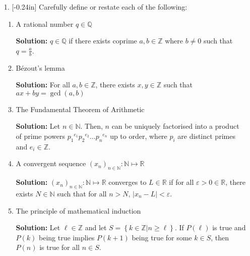\documentclass[letterpaper,12pt]{article}
\newcommand{\set}[1]{\left\{ #1 \right\}}
\theoremstyle{definition}
\begin{document}
\begin{enumerate}
    \item[1.] \reversemarginpar{}[-0.24in] Carefully define or restate each of the following: \begin{enumerate}
        \item A rational number $q \in \mathbb{Q}$
        \begin{mdframed}
            \textbf{Solution:}
            $q \in \mathbb{Q}$ if there exists coprime $a,b \in \mathbb{Z}$ where $b \neq 0$ such that $q = \frac{a}{b}$.
        \end{mdframed}
        \vspace{0.5in}
        \item Bézout's lemma
                 \begin{mdframed}
            \textbf{Solution:}
            For all $a,b \in \mathbb{Z}$, there exists $x,y \in \mathbb{Z}$ such that $ax + by = \gcd (a,b)$
        \end{mdframed}
                \vspace{0.5in}
        \item The Fundamental Theorem of Arithmetic
                 \begin{mdframed}
            \textbf{Solution:}
            Let $n \in \mathbb{N}$. Then, $n$ can be uniquely factorised into a product of prime powers ${p_1}^{e_1}{p_2}^{e_2}\ldots {p_n}^{e_n}$ up to order, where $p_i$ are distinct primes and $e_i \in \mathbb{Z}$.
        \end{mdframed}
                \vspace{0.3in}
        \item A convergent sequence $(x_n)_{n \in \mathbb{N}} : \mathbb{N} \mapsto \mathbb{R}$
                 \begin{mdframed}
            \textbf{Solution:}
             $(x_n)_{n \in \mathbb{N}} : \mathbb{N} \mapsto \mathbb{R}$ converges to $L \in \mathbb{R}$ if for all $\varepsilon > 0 \in \mathbb{R}$, there exists $N \in \mathbb{N}$ such that for all $n > N$, $|x_n - L | < \varepsilon$.
        \end{mdframed}
                \vspace{0.3in}
        \item The principle of mathematical induction
         \begin{mdframed}
            \textbf{Solution:}
            Let $\ell \in \mathbb{Z}$ and let $S = \set{k \in \mathbb{Z} | n \geq \ell}$. If $P(\ell)$ is true and $P(k)$ being true implies $P(k+1)$ being true for some $k \in S$, then $P(n)$ is true for all $n \in S$.
        \end{mdframed}
    \end{enumerate}
\end{enumerate}
\end{document}

